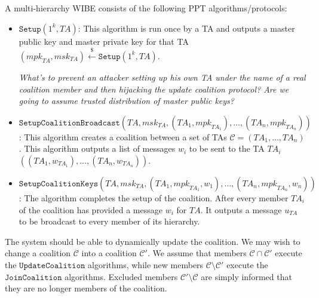 \documentclass{llncs}
\newcommand{\TA}{\mathit{TA}}
\newcommand{\mpk}{\mathit{mpk}}
\newcommand{\msk}{\mathit{msk}}
\newcommand{\getsr}{\stackrel{{\scriptscriptstyle\$}}{\gets}}
\begin{document}
A multi-hierarchy WIBE consists of the following PPT
algorithms/protocols:
\begin{itemize}
\item $\texttt{Setup}(1^{k},\TA)$: This algorithm is run
once by a TA and outputs a master public key and master private key
for that TA $(\mpk_{\TA},\msk_{\TA})\getsr
\texttt{Setup}(1^{k},\TA)$. \medskip

\emph{What's to prevent an attacker setting up his own TA under the
name of a real coalition member and then hijacking the update
coalition protocol? Are we going to assume trusted distribution of
master public keys?}\medskip

\item
$\texttt{SetupCoalitionBroadcast}(\TA,\msk_{\TA},(\TA_{1},\mpk_{\TA_{1}}),\ldots,
(\TA_{n},\mpk_{\TA_{n}}))$: This algorithm creates a coalition
between a set of TAs $\mathcal{C} = (\TA_{1},\ldots,\TA_{n})$. This
algorithm outputs a list of messages $w_{i}$ to be sent to the TA
$\TA_{i}$
$((\TA_{1},w_{\TA_{1}}),\ldots,(\TA_{n},w_{\TA_{n}}))$.\medskip

\item $\texttt{SetupCoalitionKeys}(\TA,\msk_{\TA},(\TA_{1},\mpk_{\TA_{1}},w_{1}),\ldots,
(\TA_{n},\mpk_{\TA_{n}},w_{n}))$: The algorithm completes the setup
of the coalition. After every member $\TA_{i}$ of the coalition has
provided a message $w_{i}$ for $\TA$. It outputs a message $u_{\TA}$
to be broadcast to every member of its hierarchy.
\end{itemize}
The system should be able to dynamically update the coalition. We
may wish to change a coalition $\mathcal{C}$ into a coalition
$\mathcal{C}'$. We assume that members $\mathcal{C} \cap
\mathcal{C}'$ execute the $\texttt{UpdateCoalition}$ algorithms,
while new members $\mathcal{C}\setminus \mathcal{C}'$ execute the
$\texttt{JoinCoalition}$ algorithms. Excluded members
$\mathcal{C}'\setminus \mathcal{C}$ are simply informed that they
are no longer members of the coalition.
\end{document}
